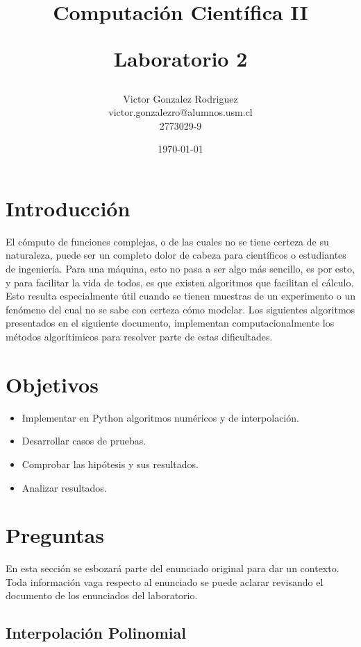 \documentclass[12pt,letterpaper]{article}
\begin{document}
\title{Computación Científica II \\ \begin{Large}Laboratorio 2\end{Large}} 
\author{Victor Gonzalez Rodriguez\\victor.gonzalezro@alumnos.usm.cl\\2773029-9}
\date{\today}
\maketitle

\section{Introducción}
El cómputo de funciones complejas, o de las cuales no se tiene certeza de su naturaleza, puede ser un completo dolor de cabeza para científicos o estudiantes de ingeniería. Para una máquina, esto no pasa a ser algo más sencillo, es por esto, y para facilitar la vida de todos, es que existen algoritmos que facilitan el cálculo. Esto resulta especialmente útil cuando se tienen muestras de un experimento o un fenómeno del cual no se sabe con certeza cómo modelar. Los siguientes algoritmos presentados en el siguiente documento, implementan computacionalmente los métodos algorítimicos para resolver parte de estas dificultades.

\section{Objetivos}
\begin{itemize}
\item Implementar en Python algoritmos numéricos y de interpolación.
\item Desarrollar casos de pruebas.
\item Comprobar las hipótesis y sus resultados.
\item Analizar resultados.
\end{itemize}

\section{Preguntas}
En esta sección se esbozará parte del enunciado original para dar un contexto. Toda información vaga respecto al enunciado se puede aclarar revisando el documento de los enunciados del laboratorio.

\subsection{Interpolación Polinomial}
\end{document}
